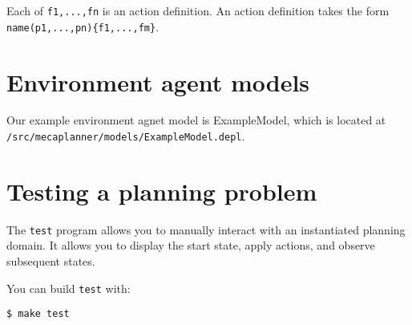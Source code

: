 \documentclass{article}
\begin{document}
Each of \verb|f1,...,fn| is an action definition. An action definition
takes the form \verb|name(p1,...,pn){f1,...,fm}|.

 


\section{Environment agent models}

Our example environment agnet model is ExampleModel, which is located at\\
\texttt{/src/mecaplanner/models/ExampleModel.depl}.




\section{Testing a planning problem}
The \verb|test| program allows you to manually interact with an instantiated planning domain.
It allows you to display the start state, apply actions, and observe subsequent
states.

You can build \verb|test| with:
\begin{lstlisting}
$ make test
\end{lstlisting}
\end{document}
